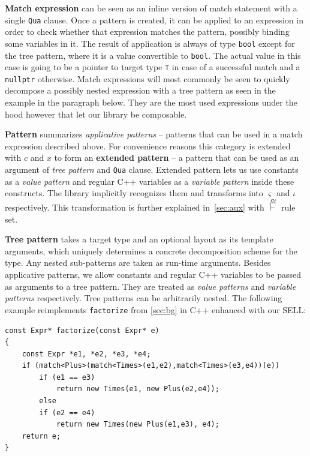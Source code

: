 \documentclass[preprint]{sigplanconf}
\makeatletter
\DeclareRobustCommand{\code}[1]{{\lstinline[breaklines=false,escapechar=@]{#1}}}
\makeatother
\begin{document}
{\bf Match expression} can be seen as an inline version of match statement with 
a single \code{Qua} clause. Once a pattern is created, it can be applied to an 
expression in order to check whether that expression matches the pattern, 
possibly binding some variables in it. The result of application is always of 
type \code{bool} except for the tree pattern, where it is a value convertible to 
\code{bool}. The actual value in this case is going to be a pointer to target 
type \code{T} in case of a successful match and a \code{nullptr} otherwise. 
Match expressions will most commonly be seen to quickly decompose a possibly 
nested expression with a tree pattern as seen in the example in the paragraph 
below. They are the most used expressions under the hood however that let our 
library be composable. 

{\bf Pattern} summarizes \emph{applicative patterns} -- patterns that can be 
used in a match expression described above. For convenience reasons this 
category is extended with $c$ and $x$ to form an {\bf extended pattern} -- a
pattern that can be used as an argument of \emph{tree pattern} and \code{Qua} 
clause. Extended pattern lets us use constants as a \emph{value pattern} and 
regular C++ variables as a \emph{variable pattern} inside these constructs. The 
library implicitly recognizes them and transforms into $\varsigma$ and $\iota$ 
respectively. This transformation is further explained in~\textsection\ref{sec:aux} 
with $\stackrel{flt}{\vdash}$ rule set.

{\bf Tree pattern} takes a target type and an optional layout as its template 
arguments, which uniquely determines a concrete decomposition scheme for the 
type. Any nested sub-patterns are taken as run-time arguments. Besides 
applicative patterns, we allow constants and regular C++ variables to be passed 
as arguments to a tree pattern. They are treated as \emph{value patterns} and 
\emph{variable patterns} respectively. Tree patterns can be arbitrarily nested. 
The following example reimplements \code{factorize} from 
\textsection\ref{sec:bg} in C++ enhanced with our SELL:

\begin{lstlisting}
const Expr* factorize(const Expr* e)
{
    const Expr *e1, *e2, *e3, *e4;
    if (match<Plus>(match<Times>(e1,e2),match<Times>(e3,e4))(e))
        if (e1 == e3)
            return new Times(e1, new Plus(e2,e4));
        else
        if (e2 == e4)
            return new Times(new Plus(e1,e3), e4);
    return e;
}
\end{lstlisting}
\end{document}
